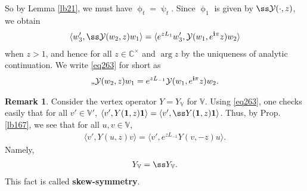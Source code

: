 \documentclass[12pt,a4paper,notitlepage]{article}
\theoremstyle{definition}
\newtheorem{rem}[df]{Remark}
\theoremstyle{plain}
\newcommand{\mc}{\mathcal}
\newcommand{\id}{\mathbf{1}}
\newcommand{\bk}[1]{\langle {#1}\rangle}
\newcommand{\im}{\mathbf{i}}
\newcommand{\Vbb}{\mathbb V}
\newcommand{\Cbb}{\mathbb C}
\numberwithin{equation}{section}
\begin{document}
So by Lemma \ref{lb21}, we must have $\upphi_t=\uppsi_t$. Since $\upphi_1$ is given by $\ss\mc Y(\cdot,z)$, we obtain
\begin{align}
\bk{w_3',\ss\mc Y(w_2,z)w_1}=\bk{e^{zL_1}w_3',\mc Y(w_1,e^{\im\pi}z)w_2}\label{eq263}
\end{align}
when $z>1$, and hence for all $z\in\Cbb^\times$ and $\arg z$ by the uniqueness of analytic continuation. We write \eqref{eq263} for short as
\begin{align}
\ss\mc Y(w_2,z)w_1=e^{zL_{-1}}\mc Y(w_1,e^{\im\pi}z)w_2.\label{eq265}
\end{align} 


\begin{rem}
Consider the vertex operator $Y=Y_\Vbb$ for $\Vbb$. Using \eqref{eq263}, one checks easily that for all $v'\in\Vbb'$, $\bk{v',Y(\id,z)\id}=\bk{v',\ss Y(\id,z)\id}$. Thus, by Prop. \ref{lb167}, we see that for all $u,v\in\Vbb$,
\begin{align}
\bk{v',Y(u,z)v}=\bk{v',e^{zL_{-1}}Y(v,-z)u}.
\end{align}
Namely,
\begin{align}
Y_\Vbb=\ss Y_\Vbb.
\end{align}
This fact is called \textbf{skew-symmetry}.
\end{rem}
\end{document}
